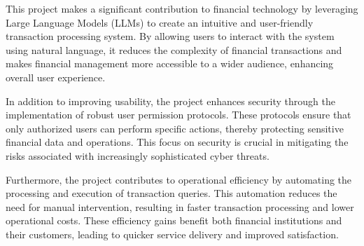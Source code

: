 \noindent This project makes a significant contribution to financial technology by leveraging Large Language Models (LLMs) to create an intuitive and user-friendly transaction processing system. By allowing users to interact with the system using natural language, it reduces the complexity of financial transactions and makes financial management more accessible to a wider audience, enhancing overall user experience.

\noindent In addition to improving usability, the project enhances security through the implementation of robust user permission protocols. These protocols ensure that only authorized users can perform specific actions, thereby protecting sensitive financial data and operations. This focus on security is crucial in mitigating the risks associated with increasingly sophisticated cyber threats.

\noindent Furthermore, the project contributes to operational efficiency by automating the processing and execution of transaction queries. This automation reduces the need for manual intervention, resulting in faster transaction processing and lower operational costs. These efficiency gains benefit both financial institutions and their customers, leading to quicker service delivery and improved satisfaction.